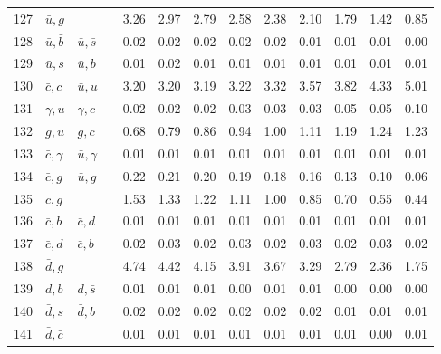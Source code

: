 \begin{tabularx}{\textwidth}{rXXX@{}S@{}S@{}S@{}S@{}S@{}S@{}S@{}S@{}S}
127 & $\bar u, g$      &                   &                  &  3.26 &  2.97 &  2.79 &  2.58 &  2.38 &  2.10 &  1.79 &  1.42 &  0.85 \\
128 & $\bar u, \bar b$ & $\bar u, \bar s$  &                  &  0.02 &  0.02 &  0.02 &  0.02 &  0.02 &  0.01 &  0.01 &  0.01 &  0.00 \\
129 & $\bar u, s$      & $\bar u, b$       &                  &  0.01 &  0.02 &  0.01 &  0.01 &  0.01 &  0.01 &  0.01 &  0.01 &  0.01 \\
130 & $\bar c, c$      & $\bar u, u$       &                  &  3.20 &  3.20 &  3.19 &  3.22 &  3.32 &  3.57 &  3.82 &  4.33 &  5.01 \\
131 & $\gamma, u$      & $\gamma, c$       &                  &  0.02 &  0.02 &  0.02 &  0.03 &  0.03 &  0.03 &  0.05 &  0.05 &  0.10 \\
132 & $g, u$           & $g,  c$           &                  &  0.68 &  0.79 &  0.86 &  0.94 &  1.00 &  1.11 &  1.19 &  1.24 &  1.23 \\
133 & $\bar c, \gamma$ & $\bar u, \gamma$  &                  &  0.01 &  0.01 &  0.01 &  0.01 &  0.01 &  0.01 &  0.01 &  0.01 &  0.01 \\
134 & $\bar c, g$      & $\bar u, g$       &                  &  0.22 &  0.21 &  0.20 &  0.19 &  0.18 &  0.16 &  0.13 &  0.10 &  0.06 \\
135 & $\bar c, g$      &                   &                  &  1.53 &  1.33 &  1.22 &  1.11 &  1.00 &  0.85 &  0.70 &  0.55 &  0.44 \\
136 & $\bar c, \bar b$ & $\bar c, \bar d$  &                  &  0.01 &  0.01 &  0.01 &  0.01 &  0.01 &  0.01 &  0.01 &  0.01 &  0.01 \\
137 & $\bar c, d$      & $\bar c, b$       &                  &  0.02 &  0.03 &  0.02 &  0.03 &  0.02 &  0.03 &  0.02 &  0.03 &  0.02 \\
138 & $\bar d, g$      &                   &                  &  4.74 &  4.42 &  4.15 &  3.91 &  3.67 &  3.29 &  2.79 &  2.36 &  1.75 \\
139 & $\bar d, \bar b$ & $\bar d, \bar s$  &                  &  0.01 &  0.01 &  0.01 &  0.00 &  0.01 &  0.01 &  0.00 &  0.00 &  0.00 \\
140 & $\bar d, s$      & $\bar d, b$       &                  &  0.02 &  0.02 &  0.02 &  0.02 &  0.02 &  0.02 &  0.01 &  0.01 &  0.01 \\
141 & $\bar d, \bar c$ &                   &                  &  0.01 &  0.01 &  0.01 &  0.01 &  0.01 &  0.01 &  0.01 &  0.00 &  0.01 \\

\end{tabularx}
